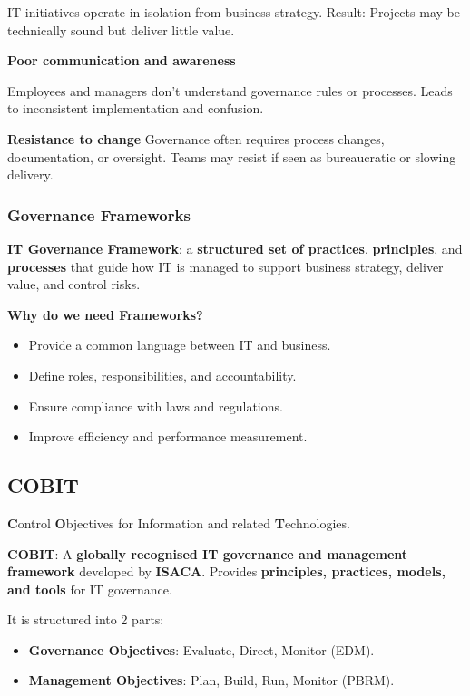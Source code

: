 IT initiatives operate in isolation from business strategy. Result: Projects may be technically sound but deliver little value.

\noindent\textbf{Poor communication and awareness}

Employees and managers don’t understand governance rules or processes. Leads to inconsistent implementation and confusion.

\noindent\textbf{Resistance to change}
Governance often requires process changes, documentation, or oversight. Teams may resist if seen as bureaucratic or slowing delivery.

\subsubsection{Governance Frameworks}

\noindent\textbf{IT Governance Framework}: a \textbf{structured set of practices}, \textbf{principles}, and \textbf{processes} that guide how IT is managed to support business strategy, deliver value, and control risks.

\noindent\textbf{Why do we need Frameworks?}

\begin{itemize}
    \item Provide a common language between IT and business.
    \item Define roles, responsibilities, and accountability.
    \item Ensure compliance with laws and regulations.
    \item Improve efficiency and performance measurement.
\end{itemize}

\subsection{COBIT}

\indent 

\noindent \textbf{C}ontrol \textbf{O}bjectives for Information and related \textbf{T}echnologies.

\noindent\textbf{COBIT}: A \textbf{globally recognised IT governance and management framework} developed by \textbf{ISACA}. Provides \textbf{principles, practices, models, and tools} for IT governance.

\bigskip

It is structured into 2 parts:

\begin{itemize}
    \item \textbf{Governance Objectives}: Evaluate, Direct, Monitor (EDM).
    \item \textbf{Management Objectives}: Plan, Build, Run, Monitor (PBRM).
\end{itemize}

